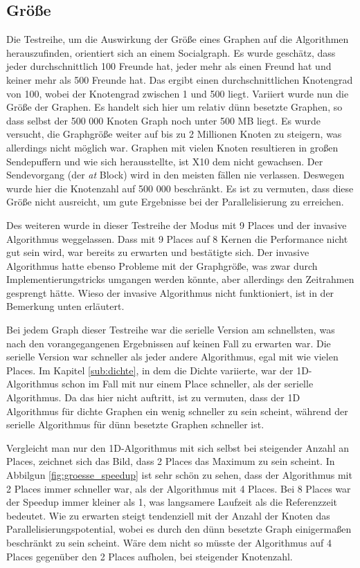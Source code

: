 \subsection{Größe} %
\label{sub:gr_e}
Die Testreihe, um die Auswirkung der Größe eines Graphen auf die Algorithmen herauszufinden, orientiert sich an einem Socialgraph. Es wurde geschätz, dass jeder durchschnittlich 100 Freunde hat, jeder mehr als einen Freund hat und keiner mehr als 500 Freunde hat. Das ergibt einen durchschnittlichen Knotengrad von 100, wobei der Knotengrad zwischen 1 und 500 liegt. Variiert wurde nun die Größe der Graphen. Es handelt sich hier um relativ dünn besetzte Graphen, so dass selbst der 500 000 Knoten Graph noch unter 500 MB liegt. Es wurde versucht, die Graphgröße weiter auf bis zu 2 Millionen Knoten zu steigern, was allerdings nicht möglich war. Graphen mit vielen Knoten resultieren in großen Sendepuffern und wie sich herausstellte, ist X10 dem nicht gewachsen. Der Sendevorgang (der \textit{at} Block) wird in den meisten fällen nie verlassen. Deswegen wurde hier die Knotenzahl auf 500 000 beschränkt. Es ist zu vermuten, dass diese Größe nicht ausreicht, um gute Ergebnisse bei der Parallelisierung zu erreichen.

Des weiteren wurde in dieser Testreihe der Modus mit 9 Places und der invasive Algorithmus weggelassen. Dass mit 9 Places auf 8 Kernen die Performance nicht gut sein wird, war bereits zu erwarten und bestätigte sich. Der invasive Algorithmus hatte ebenso Probleme mit der Graphgröße, was zwar durch Implementierungstricks umgangen werden könnte, aber allerdings den Zeitrahmen gesprengt hätte. Wieso der invasive Algorithmus nicht funktioniert, ist in der Bemerkung unten erläutert.

Bei jedem Graph dieser Testreihe war die serielle Version am schnellsten, was nach den vorangegangenen Ergebnissen auf keinen Fall zu erwarten war. Die serielle Version war schneller als jeder andere Algorithmus, egal mit wie vielen Places. Im Kapitel \ref{sub:dichte}, in dem die Dichte variierte, war der 1D-Algorithmus schon im Fall mit nur einem Place schneller, als der serielle Algorithmus. Da das hier nicht auftritt, ist zu vermuten, dass der 1D Algorithmus für dichte Graphen ein wenig schneller zu sein scheint, während der serielle Algorithmus für dünn besetzte Graphen schneller ist.

Vergleicht man nur den 1D-Algorithmus mit sich selbst bei steigender Anzahl an Places, zeichnet sich das Bild, dass 2 Places das Maximum zu sein scheint. In Abbilgun \ref{fig:groesse_speedup} ist sehr schön zu sehen, dass der Algorithmus mit 2 Places immer schneller war, als der Algorithmus mit 4 Places. Bei 8 Places war der Speedup immer kleiner als 1, was langsamere Laufzeit als die Referenzzeit bedeutet. Wie zu erwarten steigt tendenziell mit der Anzahl der Knoten das Parallelisierungspotential, wobei es durch den dünn besetzte Graph einigermaßen beschränkt zu sein scheint. Wäre dem nicht so müsste der Algorithmus auf 4 Places gegenüber den 2 Places aufholen, bei steigender Knotenzahl.


